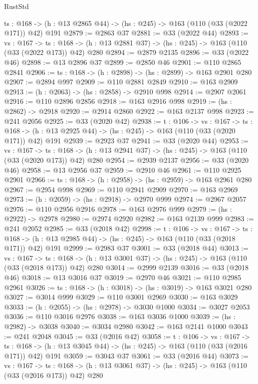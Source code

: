 \begin{lexlean}{RustStd}
\begin{coremodule}
  {ts : @168} -> (h : @13 @2865 @44) -> (hs : @245) -> @163 (@110 (@33 (@2022 @171)) @42) @191
@2879 := @2863 @37
@2881 := @33 (@2022 @44)
@2893 := {vs : @167} ->
  {ts : @168} -> (h : @13 @2881 @37) -> (hs : @245) -> @163 (@110 (@33 (@2022 @173)) @42) @280
@2894 := @2879 @2135
@2896 := @33 (@2022 @46)
@2898 := @13 @2896 @37
@2899 := @2850 @46
@2901 := @110 @2865 @2841
@2906 := {ts : @168} -> (h : @2898) -> (hs : @2899) -> @163 @2901 @280
@2907 := @2894 @997
@2909 := @110 @2881 @2849
@2910 := @163 @2909
@2913 := (h : @2063) -> (hs : @2858) -> @2910 @998
@2914 := @2907 @2061
@2916 := @110 @2896 @2856
@2918 := @163 @2916 @998
@2919 := (hs : @2862) -> @2918
@2920 := @2914 @2860
@2922 := @163 @2137 @998
@2923 := @241 @2056
@2925 := @33 (@2020 @42)
@2938 := {t : @106} ->
  {vs : @167} ->
  {ts : @168} -> (h : @13 @2925 @44) -> (hs : @245) -> @163 (@110 (@33 (@2020 @171)) @42) @191
@2939 := @2923 @37
@2941 := @33 (@2020 @44)
@2953 := {vs : @167} ->
  {ts : @168} -> (h : @13 @2941 @37) -> (hs : @245) -> @163 (@110 (@33 (@2020 @173)) @42) @280
@2954 := @2939 @2137
@2956 := @33 (@2020 @46)
@2958 := @13 @2956 @37
@2959 := @2910 @46
@2961 := @110 @2925 @2901
@2966 := {ts : @168} -> (h : @2958) -> (hs : @2959) -> @163 @2961 @280
@2967 := @2954 @998
@2969 := @110 @2941 @2909
@2970 := @163 @2969
@2973 := (h : @2059) -> (hs : @2918) -> @2970 @999
@2974 := @2967 @2057
@2976 := @110 @2956 @2916
@2978 := @163 @2976 @999
@2979 := (hs : @2922) -> @2978
@2980 := @2974 @2920
@2982 := @163 @2139 @999
@2983 := @241 @2052
@2985 := @33 (@2018 @42)
@2998 := {t : @106} ->
  {vs : @167} ->
  {ts : @168} -> (h : @13 @2985 @44) -> (hs : @245) -> @163 (@110 (@33 (@2018 @171)) @42) @191
@2999 := @2983 @37
@3001 := @33 (@2018 @44)
@3013 := {vs : @167} ->
  {ts : @168} -> (h : @13 @3001 @37) -> (hs : @245) -> @163 (@110 (@33 (@2018 @173)) @42) @280
@3014 := @2999 @2139
@3016 := @33 (@2018 @46)
@3018 := @13 @3016 @37
@3019 := @2970 @46
@3021 := @110 @2985 @2961
@3026 := {ts : @168} -> (h : @3018) -> (hs : @3019) -> @163 @3021 @280
@3027 := @3014 @999
@3029 := @110 @3001 @2969
@3030 := @163 @3029
@3033 := (h : @2055) -> (hs : @2978) -> @3030 @1000
@3034 := @3027 @2053
@3036 := @110 @3016 @2976
@3038 := @163 @3036 @1000
@3039 := (hs : @2982) -> @3038
@3040 := @3034 @2980
@3042 := @163 @2141 @1000
@3043 := @241 @2048
@3045 := @33 (@2016 @42)
@3058 := {t : @106} ->
  {vs : @167} ->
  {ts : @168} -> (h : @13 @3045 @44) -> (hs : @245) -> @163 (@110 (@33 (@2016 @171)) @42) @191
@3059 := @3043 @37
@3061 := @33 (@2016 @44)
@3073 := {vs : @167} ->
  {ts : @168} -> (h : @13 @3061 @37) -> (hs : @245) -> @163 (@110 (@33 (@2016 @173)) @42) @280

\end{coremodule}
\end{lexlean}
